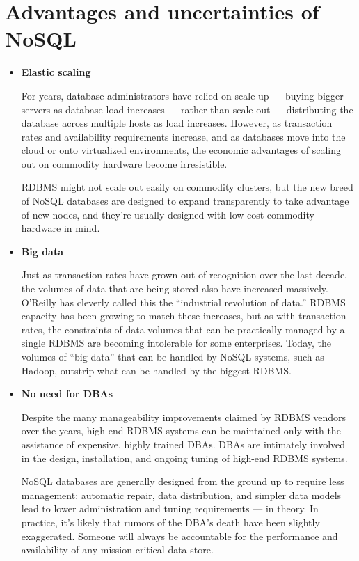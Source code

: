 \section{Advantages and uncertainties of NoSQL}

\begin{itemize}

\item \textbf{Elastic scaling}

For years, database administrators have relied on scale up — buying bigger servers as database load increases — rather than scale out — distributing the database across multiple hosts as load increases. However, as transaction rates and availability requirements increase, and as databases move into the cloud or onto virtualized environments, the economic advantages of scaling out on commodity hardware become irresistible.

RDBMS might not scale out easily on commodity clusters, but the new breed of NoSQL databases are designed to expand transparently to take advantage of new nodes, and they’re usually designed with low-cost commodity hardware in mind.


\item \textbf{Big data}

Just as transaction rates have grown out of recognition over the last decade, the volumes of data that are being stored also have increased massively. O’Reilly has cleverly called this the “industrial revolution of data.” RDBMS capacity has been growing to match these increases, but as with transaction rates, the constraints of data volumes that can be practically managed by a single RDBMS are becoming intolerable for some enterprises. Today, the volumes of “big data” that can be handled by NoSQL systems, such as Hadoop, outstrip what can be handled by the biggest RDBMS.


\item \textbf{No need for DBAs}

Despite the many manageability improvements claimed by RDBMS vendors over the years, high-end RDBMS systems can be maintained only with the assistance of expensive, highly trained DBAs. DBAs are intimately involved in the design, installation, and ongoing tuning of high-end RDBMS systems.

NoSQL databases are generally designed from the ground up to require less management:  automatic repair, data distribution, and simpler data models lead to lower administration and tuning requirements — in theory. In practice, it’s likely that rumors of the DBA’s death have been slightly exaggerated. Someone will always be accountable for the performance and availability of any mission-critical data store.



\end{itemize}
